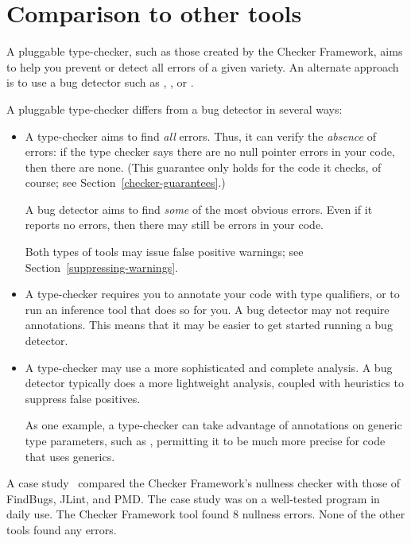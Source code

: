 \section{Comparison to other tools\label{other-tools}}

A pluggable type-checker, such as those created by the Checker Framework,
aims to help you prevent or detect all errors of a given variety.  An
alternate approach is to use a bug detector such as
,
, or
.

A pluggable type-checker
differs from a bug detector in several ways:
\begin{itemize}
\item
  A type-checker aims to find \emph{all} errors.  Thus, it can verify the
  \emph{absence} of errors:  if the type checker says there are no null
  pointer errors in your code, then there are none.  (This guarantee only
  holds for the code it checks, of course; see
  Section~\ref{checker-guarantees}.)

  A bug detector aims to find \emph{some} of the most obvious errors.  Even
  if it reports no errors, then there may still be errors in your code.

  Both types of tools may issue false positive warnings; see
  Section~\ref{suppressing-warnings}.

\item
  A type-checker requires you to annotate your code with type qualifiers,
  or to run an inference tool that does so for you.  A bug detector may not
  require annotations.  This means that it may be easier to get started
  running a bug detector.

\item
  A type-checker may use a more sophisticated and complete analysis.
  A bug detector typically does a more lightweight analysis, coupled with
  heuristics to suppress false positives.

  As one example, a type-checker can take advantage of annotations on
  generic type parameters, such as , permitting
  it to be much more precise for code that uses generics.

\end{itemize}

A case study~\cite[\S6]{PapiACPE2008} compared the Checker Framework's nullness
checker with those of FindBugs, JLint, and PMD\@.  The case study was on a
well-tested program in daily use.  The Checker Framework tool found 8
nullness errors.  None of the other tools found any errors.

